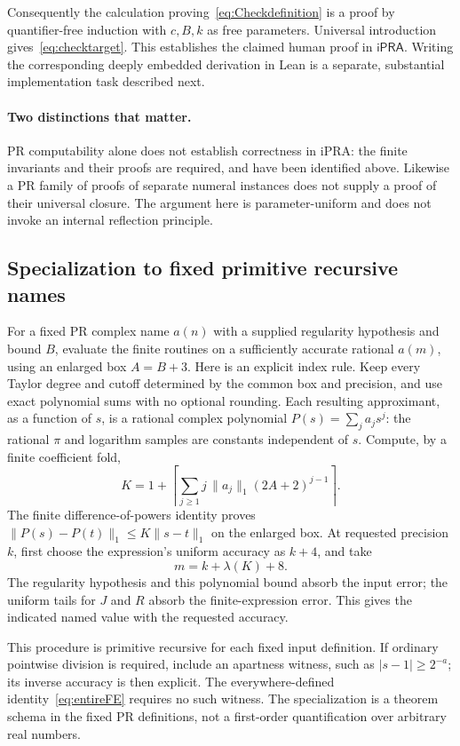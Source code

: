 \documentclass[11pt,letterpaper]{article}
\numberwithin{equation}{section}
\theoremstyle{definition}
\newcommand{\ipra}{\mathsf{iPRA}}
\newcommand{\normone}[1]{\lVert #1\rVert_1}
\newcommand{\gamrec}{R}
\newcommand{\lceilog}{\lambda}
\begin{document}
Consequently the calculation proving~\eqref{eq:Checkdefinition}
is a proof by quantifier-free induction with \(c,B,k\) as free
parameters. Universal introduction gives~\eqref{eq:checktarget}.
This establishes the claimed human proof in \(\ipra\).
Writing the corresponding deeply embedded derivation in Lean is
a separate, substantial implementation task described next.

\paragraph{Two distinctions that matter.}
PR computability alone does not establish correctness in iPRA:
the finite invariants and their proofs are required, and have been
identified above. Likewise a PR family of proofs of separate numeral
instances does not supply a proof of their universal closure.
The argument here is parameter-uniform and does not invoke an
internal reflection principle.

\subsection{Specialization to fixed primitive recursive names}

For a fixed PR complex name \(a(n)\) with a supplied regularity
hypothesis and bound \(B\), evaluate the finite routines on
a sufficiently accurate rational \(a(m)\), using an enlarged
box \(A=B+3\). Here is an explicit index rule.
Keep every Taylor degree and cutoff determined by the common
box and precision, and use exact polynomial sums with no
optional rounding. Each resulting approximant, as a function
of \(s\), is a rational complex polynomial
\(P(s)=\sum_j a_j s^j\): the rational \(\pi\) and logarithm
samples are constants independent of \(s\).
Compute, by a finite coefficient fold,
\[
 K=1+\left\lceil
       \sum_{j\ge1}j\,\normone{a_j}(2A+2)^{j-1}
       \right\rceil.
\]
The finite difference-of-powers identity proves
\(\normone{P(s)-P(t)}\le K\normone{s-t}\)
on the enlarged box. At requested precision \(k\), first
choose the expression's uniform accuracy as \(k+4\), and take
\[
                        m=k+\lceilog(K)+8.
\]
The regularity hypothesis and this polynomial bound absorb
the input error; the uniform tails for \(J\) and \(\gamrec\)
absorb the finite-expression error. This gives the indicated
named value with the requested accuracy.

This procedure is primitive recursive for each fixed input
definition. If ordinary pointwise division is required, include
an apartness witness, such as \(|s-1|\ge2^{-a}\); its inverse
accuracy is then explicit. The everywhere-defined
identity~\eqref{eq:entireFE} requires no such witness.
The specialization is a theorem schema in the fixed PR definitions,
not a first-order quantification over arbitrary real numbers.
\end{document}
